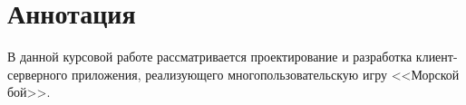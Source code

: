 ﻿%
\section{Аннотация}
	В данной курсовой работе рассматривается проектирование и разработка клиент-серверного приложения, реализующего
	многопользовательскую игру <<Морской бой>>.

\setcounter{page}{2}



\tableofcontents

\newpage
\endinput
